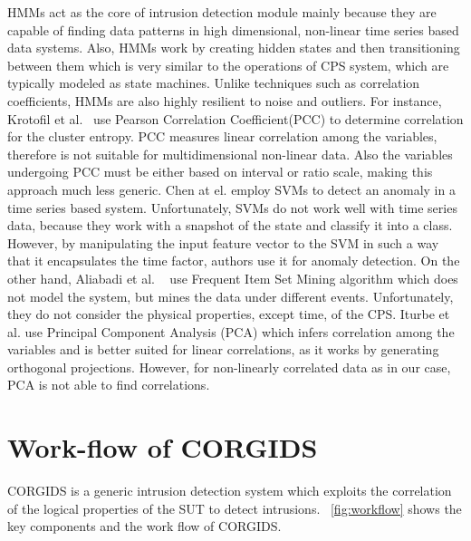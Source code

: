 HMMs act as the core of intrusion detection module mainly because they are capable of finding data patterns in high dimensional, non-linear time series based data systems. Also, HMMs work by creating hidden states and then transitioning between them which is very similar to the operations of CPS system, which are typically modeled as state machines.
Unlike techniques such as correlation coefficients, HMMs are also highly resilient to noise and outliers. 
For instance, Krotofil et al.~\cite{krotofil2015process} use Pearson Correlation Coefficient(PCC) to determine correlation for the cluster entropy. PCC measures linear correlation among the variables, therefore is not suitable for multidimensional non-linear data. Also the variables undergoing PCC must be either based on interval or ratio scale, making this approach much less generic. Chen at el.  \cite{chen2018learning} employ SVMs to detect an anomaly in a time series based system. Unfortunately, SVMs do not work well with time series data, because they work with a snapshot of the state and classify it into a class. However, by manipulating the input feature vector to the SVM in such a way that it encapsulates the time factor, authors use it for anomaly detection. On the other hand, Aliabadi et al. ~\cite{aliabadi2017artinali} use Frequent Item Set Mining algorithm which does not model the system, but mines the data under different events. Unfortunately, they do not consider the physical properties, except time, of the CPS. Iturbe et al. \cite{iturbe2017feasibility} use Principal Component Analysis (PCA) which infers correlation among the variables and is better suited for linear correlations, as it works by generating orthogonal projections. However, for non-linearly correlated data as in our case, PCA is not able to find correlations.

\section{Work-flow of CORGIDS}
CORGIDS is a generic intrusion detection system which exploits the correlation of the logical properties of the SUT to detect intrusions. ~\autoref{fig:workflow} shows the key components and the work flow of CORGIDS.

